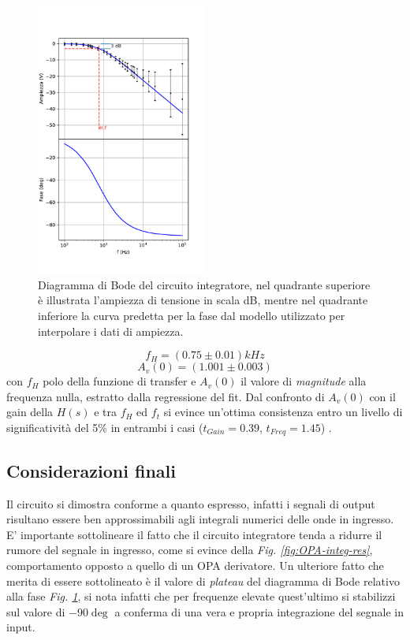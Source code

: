 \documentclass[journal]{IEEEtran}
\begin{document}
\begin{figure}[H]%
\begin {center}
\includegraphics[width=0.50\textwidth]{analysis/output/OPA-integrator_bode(mag+phase).pdf}
\caption{Diagramma di Bode del circuito integratore, nel quadrante superiore è illustrata l'ampiezza di tensione in scala dB, mentre nel quadrante inferiore la curva predetta per la fase dal modello utilizzato per interpolare i dati di ampiezza.}
\label{fig:integ-bode}
\end {center}
\end{figure}
\[f_H = (0.75 \pm 0.01) kHz\]
\[A_v(0) = (1.001 \pm 0.003)\]
con $f_H$ polo della funzione di transfer e $A_v(0)$ il valore di \textit{magnitude} alla frequenza nulla, estratto dalla regressione del fit.
Dal confronto di $A_v(0)$ con il gain della $H(s)$ e tra $f_H$ ed $f_t$ si evince un'ottima consistenza entro un livello di significatività del 5\% in entrambi i casi ($t_{Gain} = 0.39 $, $t_{Freq} = 1.45 $) .
\subsection{\textbf{Considerazioni finali}}
Il circuito si dimostra conforme a quanto espresso, infatti i segnali di output risultano essere ben approssimabili agli integrali numerici delle onde in ingresso. E' importante sottolineare il fatto che il circuito integratore tenda a ridurre il rumore del segnale in ingresso, come si evince della \textit{Fig. \ref{fig:OPA-integ-res}}, comportamento opposto a quello di un OPA derivatore. Un ulteriore fatto che merita di essere sottolineato è il valore di \textit{plateau} del diagramma di Bode relativo alla fase \textit{Fig. \ref{fig:integ-bode}}, si nota infatti che per frequenze elevate quest'ultimo si stabilizzi sul valore di $-90 \deg$ a conferma di una vera e propria integrazione del segnale in input.   
\end{document}
